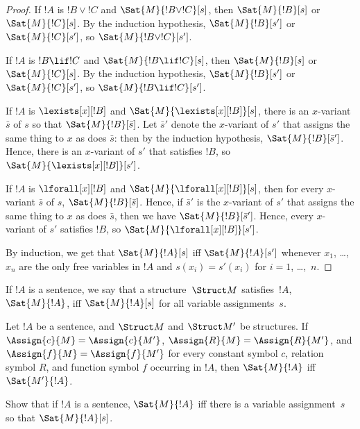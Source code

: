\documentclass[../../include/open-logic-section]{subfiles}
\begin{document}
\begin{proof}
If $!A$ is $!B \lor !C$ and $\Sat{M}{!B \lor !C}[s]$, then
$\Sat{M}{!B}[s]$ or $\Sat{M}{!C}[s]$. By the induction hypothesis,
$\Sat{M}{!B}[s']$ or $\Sat{M}{!C}[s']$, so $\Sat{M}{!B \lor !C}[s']$.

If $!A$ is $!B \lif !C$ and $\Sat{M}{!B \lif !C}[s]$, then
$\Sat{M}{!B}[s]$ or $\Sat{M}{!C}[s]$. By the induction hypothesis,
$\Sat{M}{!B}[s']$ or $\Sat{M}{!C}[s']$, so $\Sat{M}{!B \lif !C}[s']$.

If $!A$ is $\lexists[x][!B]$ and $\Sat{M}{\lexists[x][!B]}[s]$, there
is an $x$-variant $\bar{s}$ of $s$ so that $\Sat{M}{!B}[\bar{s}]$. Let
$\bar{s}'$ denote the $x$-variant of $s'$ that assigns the same thing
to $x$ as does $\bar{s}$: then by the induction hypothesis,
$\Sat{M}{!B}[\bar{s}']$. Hence, there is an $x$-variant of $s'$ that
satisfies $!B$, so $\Sat{M}{\lexists[x][!B]}[s']$.

If $!A$ is $\lforall[x][!B]$ and $\Sat{M}{\lforall[x][!B]}[s]$, then
for every $x$-variant $\bar{s}$ of $s$, $\Sat{M}{!B}[\bar{s}]$. Hence,
if $\bar{s}'$ is the $x$-variant of $s'$ that assigns the same thing
to $x$ as does $\bar{s}$, then we have $\Sat{M}{!B}[\bar{s}']$. Hence,
every $x$-variant of $s'$ satisfies $!B$, so
$\Sat{M}{\lforall[x][!B]}[s']$.

By induction, we get that $\Sat{M}{!A}[s]$ iff $\Sat{M}{!A}[s']$
whenever $x_1$, \dots, $x_n$ are the only free variables in $!A$ and
$s(x_i)=s'(x_i)$ for $i=1$, \dots,~$n$.
\end{proof}
 
\begin{defn}
If $!A$ is a sentence, we say that a structure~$\Struct M$
satisfies~$!A$, $\Sat{M}{!A}$, iff $\Sat{M}{!A}[s]$ for all variable
assignments~$s$.
\end{defn}


\begin{cor}[Extensionality]
Let $!A$ be a sentence, and $\Struct M$ and $\Struct M'$ be structures. 
If $\Assign{c}{M} = \Assign{c}{M'}$, $\Assign{R}{M}=\Assign{R}{M'}$, and 
$\Assign{f}{M} = \Assign{f}{M'}$ for every constant symbol $c$, relation 
symbol $R$, and function symbol $f$ occurring in $!A$, then $\Sat{M}{!A}$ 
iff $\Sat{M'}{!A}$.
\end{cor}

\begin{prob}
Show that if $!A$ is a sentence, $\Sat{M}{!A}$ iff there is a variable
assignment~$s$ so that $\Sat{M}{!A}[s]$.
\end{prob}
\end{document}
